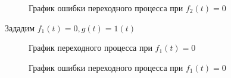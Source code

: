 \documentclass[a4paper, 11pt]{article}
\begin{document}
\begin{figure}[h!]
    \caption{График ошибки переходного процесса при $f_2(t) = 0$}
    \label{tree}
\end{figure}

Зададим $f_1(t) = 0, g(t) = 1(t)$

\begin{figure}[h!]
    \caption{График переходного процесса при $f_1(t) = 0$}
    \label{two}
\end{figure}
    
\newpage    
    
\begin{figure}[h!]
    \caption{График ошибки переходного процесса при $f_1(t) = 0$}
    \label{tree}
\end{figure}
\end{document}
